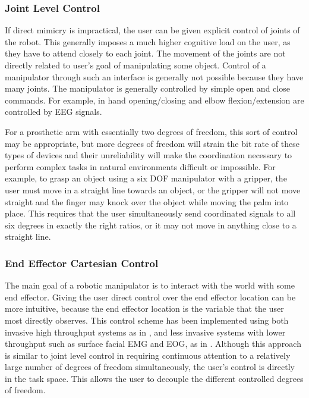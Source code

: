  \subsubsection{Joint Level Control}
If direct mimicry is impractical, the user can be given explicit control of joints of the robot. This generally imposes a much higher cognitive load on the user, as they have to attend closely to each joint. The movement of the joints are not directly related to user's goal of manipulating some object. Control of a manipulator through such an interface is generally not possible because they have many joints. The manipulator is generally controlled by simple open and close commands. For example, in \cite{Horki2011} hand opening/closing and elbow flexion/extension are controlled by EEG signals.

 For a prosthetic arm with essentially two degrees of freedom, this sort of control may be appropriate, but more degrees of freedom will strain the bit rate of these types of devices and their unreliability will make the coordination necessary to perform complex tasks in natural environments difficult or impossible. For example, to grasp an object using a six DOF manipulator with a gripper, the user must move in a straight line towards an object, or the gripper will not move straight and the finger may knock over the object while moving the palm into place.  This requires that the user simultaneously send coordinated signals to all six degrees in exactly the right ratios, or it may not move in anything close to a straight line.  

\subsubsection{End Effector Cartesian Control}
The main goal of a robotic manipulator is to interact with the world with some end effector. Giving the user direct control over the end effector location can be more intuitive, because the end effector location is the variable that the user most directly observes. This control scheme has been implemented using both invasive high throughput systems as in  \cite{Vogel2010},  and less invasive systems with lower throughput such as surface facial EMG and EOG, as in \cite{Postelnicu2011, Sagawa2005,Gomez-Gil2011,Ranky2010,Shenoy2008}.  Although this approach is similar to joint level control in requiring continuous attention to a relatively large number of degrees of freedom simultaneously, the user's control is directly in the task space. This allows the user to decouple the different controlled degrees of freedom.   

